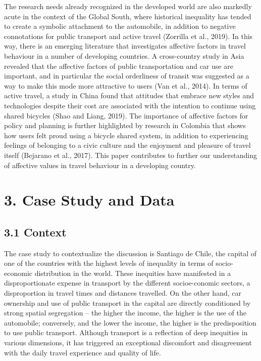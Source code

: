 \documentclass[]{elsarticle} %
\begin{document}
The research needs already recognized in the developed world are also
markedly acute in the context of the Global South, where historical
inequality has tended to create a symbolic attachment to the automobile,
in addition to negative connotations for public transport and active
travel (Zorrilla et al., 2019). In this way, there is an emerging
literature that investigates affective factors in travel behaviour in a
number of developing countries. A cross-country study in Asia revealed
that the affective factors of public transportation and car use are
important, and in particular the social orderliness of transit was
suggested as a way to make this mode more attractive to users (Van et
al., 2014). In terms of active travel, a study in China found that
attitudes that embrace new styles and technologies despite their cost
are associated with the intention to continue using shared bicycles
(Shao and Liang, 2019). The importance of affective factors for policy
and planning is further highlighted by research in Colombia that shows
how users felt proud using a bicycle shared system, in addition to
experiencing feelings of belonging to a civic culture and the enjoyment
and pleasure of travel itself (Bejarano et al., 2017). This paper
contributes to further our understanding of affective values in travel
behaviour in a developing country.

\hypertarget{case-study-and-data}{%
\section{3. Case Study and Data}\label{case-study-and-data}}

\hypertarget{context}{%
\subsection{3.1 Context}\label{context}}

The case study to contextualize the discussion is Santiago de Chile, the
capital of one of the countries with the highest levels of inequality in
terms of socio-economic distribution in the world. These inequities have
manifested in a disproportionate expense in transport by the different
socioe-conomic sectors, a disproportion in travel times and distances
travelled. On the other hand, car ownership and use of public transport
in the capital are directly conditioned by strong spatial segregation --
the higher the income, the higher is the use of the automobile;
conversely, and the lower the income, the higher is the predisposition
to use public transport. Although transport is a reflection of deep
inequities in various dimensions, it has triggered an exceptional
discomfort and disagreement with the daily travel experience and quality
of life.
\end{document}
